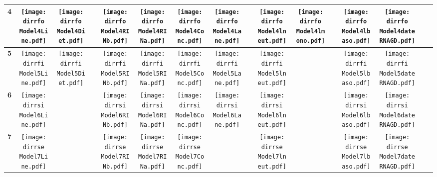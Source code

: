 \documentclass[landscape]{article}
\def \dirrfo {/run/user/1000/gvfs/smb-share:server=cyfiles.iastate.edu,share=09/22/ntyet/R/RA/Data/Reanalysis Data/resultcbc/Model4.Line.Diet.RINb.RINa.Conc.Lane.lneut.lmono.lbaso.dateRNAGD/}
\def \dirrfi {/run/user/1000/gvfs/smb-share:server=cyfiles.iastate.edu,share=09/22/ntyet/R/RA/Data/Reanalysis Data/resultcbc/Model5.Line.Diet.RINb.RINa.Conc.Lane.lneut.lbaso.dateRNAGD/}
\def \dirrsi{/run/user/1000/gvfs/smb-share:server=cyfiles.iastate.edu,share=09/22/ntyet/R/RA/Data/Reanalysis Data/resultcbc/Model6.Line.RINb.RINa.Conc.Lane.lneut.lbaso.dateRNAGD/}
\def \dirrse{/run/user/1000/gvfs/smb-share:server=cyfiles.iastate.edu,share=09/22/ntyet/R/RA/Data/Reanalysis Data/resultcbc/Model7.Line.RINb.RINa.Conc.lneut.lbaso.dateRNAGD/}
\begin{document}
\begin{table}
\begin{tabular}{cccccccccccccccc}
     {\Huge \textbf{4}} 
      &\texttt{[image: \\dirrfo Model4Line.pdf]}
      &\texttt{[image: \\dirrfo Model4Diet.pdf]}
      &
      &\texttt{[image: \\dirrfo Model4RINb.pdf]}
      &\texttt{[image: \\dirrfo Model4RINa.pdf]}
      &\texttt{[image: \\dirrfo Model4Conc.pdf]}
      &\texttt{[image: \\dirrfo Model4Lane.pdf]}
      &
      &\texttt{[image: \\dirrfo Model4lneut.pdf]}
      &\texttt{[image: \\dirrfo Model4lmono.pdf]}
      &
      &\texttt{[image: \\dirrfo Model4lbaso.pdf]}
      &\texttt{[image: \\dirrfo Model4dateRNAGD.pdf]}
     \\
     \hline
     
     {\Huge \textbf{5}} 
      &\texttt{[image: \\dirrfi Model5Line.pdf]}
      &\texttt{[image: \\dirrfi Model5Diet.pdf]}
      &
      &\texttt{[image: \\dirrfi Model5RINb.pdf]}
      &\texttt{[image: \\dirrfi Model5RINa.pdf]}
      &\texttt{[image: \\dirrfi Model5Conc.pdf]}
      &\texttt{[image: \\dirrfi Model5Lane.pdf]}
      &
      &\texttt{[image: \\dirrfi Model5lneut.pdf]}
      &
      &
      &\texttt{[image: \\dirrfi Model5lbaso.pdf]}
      &\texttt{[image: \\dirrfi Model5dateRNAGD.pdf]}
      
     \\
     \hline
     {\Huge \textbf{6}} 
      &\texttt{[image: \\dirrsi Model6Line.pdf]}
      &
      &
      &\texttt{[image: \\dirrsi Model6RINb.pdf]}
      &\texttt{[image: \\dirrsi Model6RINa.pdf]}
      &\texttt{[image: \\dirrsi Model6Conc.pdf]}
      &\texttt{[image: \\dirrsi Model6Lane.pdf]}
      &
      &\texttt{[image: \\dirrsi Model6lneut.pdf]}
      &
      &
      &\texttt{[image: \\dirrsi Model6lbaso.pdf]}
      &\texttt{[image: \\dirrsi Model6dateRNAGD.pdf]}
      
     \\
     \hline
     {\Huge \textbf{7}} 
      &\texttt{[image: \\dirrse Model7Line.pdf]}
      &
      &
      &\texttt{[image: \\dirrse Model7RINb.pdf]}
      &\texttt{[image: \\dirrse Model7RINa.pdf]}
      &\texttt{[image: \\dirrse Model7Conc.pdf]}
      &
      &
      &\texttt{[image: \\dirrse Model7lneut.pdf]}
      &
      &
      &\texttt{[image: \\dirrse Model7lbaso.pdf]}
      &\texttt{[image: \\dirrse Model7dateRNAGD.pdf]}
      
     \\
     \hline
     
     
     
\end{tabular}
\end{table}
\end{document}
